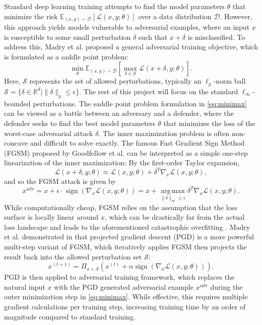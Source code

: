 \documentclass{article}
\begin{document}
Standard deep learning training attempts to find the model parameters $\theta$ that minimize the risk $\mathbb{E}_{(x, y) \sim \mathcal{D}}[\mathcal{L}(x, y; \theta)]$ over a data distribution $\mathcal{D}$. However, this approach yields models vulnerable to adversarial examples, where an input $x$ is susceptible to some small perturbation $\delta$ such that $x + \delta$ is misclassified. To address this, Madry et al. \cite{madry2019deeplearningmodelsresistant} proposed a general adversarial training objective, which is formulated as a saddle point problem:
\begin{equation}
  \min_{\theta} \mathbb{E}_{(x, y) \sim \mathcal{D}}[\max_{\delta \in \mathcal{S}} \mathcal{L}(x + \delta, y; \theta)].
  \label{eq:minimax}
\end{equation}
Here, $\mathcal{S}$ represents the set of allowed perturbations, typically an $\ell_p$-norm ball $\mathcal{S} = \{ \delta \in \mathbb{R}^d \mid \|\delta\|_p \leq \epsilon \}$. The rest of this project will focus on the standard $\ell_\infty$-bounded perturbations. The saddle point problem formulation in \eqref{eq:minimax} can be viewed as a battle between an adversary and a defender, where the defender seeks to find the best model parameters $\theta$ that minimizes the loss of the worst-case adversarial attack $\delta$. The inner maximization problem is often non-concave and difficult to solve exactly. The famous Fast Gradient Sign Method (FGSM) proposed by Goodfellow et al. \cite{goodfellow2015explainingharnessingadversarialexamples} can be interpreted as a simple one-step linearization of the inner maximization: By the first-order Taylor expansion,
\begin{equation}
  \mathcal{L}(x + \delta, y; \theta) \approx \mathcal{L}(x, y; \theta) + \delta^T\nabla_x \mathcal{L}(x, y; \theta),
  \label{eq:taylor}
\end{equation}
and so the FGSM attack is given by
\begin{equation}
  x^{\text{adv}} = x + \epsilon \cdot \operatorname{sign}(\nabla_x \mathcal{L}(x, y; \theta)) = x + \operatorname*{arg \, max}_{\|\delta\|_{\infty} \leq \epsilon} \delta^T\nabla_x \mathcal{L}(x, y; \theta). 
  \label{eq:fgsm}
\end{equation}
While computationally cheap, FGSM relies on the assumption that the loss surface is locally linear around $x$, which can be drastically far from the actual loss landscape and leads to the aforementioned catastrophic overfitting \cite{kang2021understandingcatastrophicoverfittingadversarial}. Madry et al. demonstrated in \cite{madry2019deeplearningmodelsresistant} that projected gradient descent (PGD) is a more powerful multi-step variant of FGSM, which iteratively applies FGSM then projects the result back into the allowed perturbation set $\mathcal{S}$:
\[
  x^{(t+1)} = \Pi_{x + \mathcal{S}}(x^{(t)} + \alpha \operatorname{sign}(\nabla_x \mathcal{L}(x, y; \theta))).
\]
PGD is then applied to adversarial training framework, which replaces the natural input $x$ with the PGD generated adversarial example $x^{\text{adv}}$ during the outer minimization step in \eqref{eq:minimax}. While effective, this requires multiple gradient calculations per training step, increasing training time by an order of magnitude compared to standard training.
\end{document}
